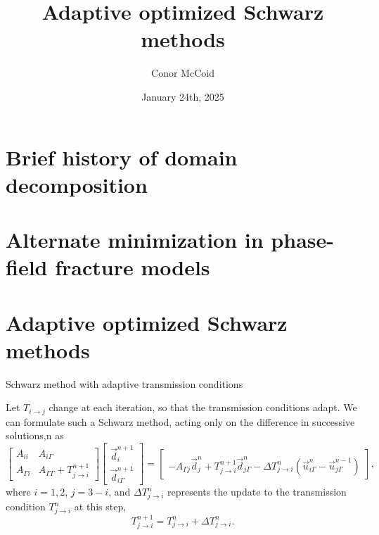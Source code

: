 \documentclass{beamer}
\title{Adaptive optimized Schwarz methods}
\author{Conor McCoid}
\institute{McMaster University}
\date{January 24th, 2025}
\begin{document}
\maketitle

\section{Brief history of domain decomposition} %





\section{Alternate minimization in phase-field fracture models} %






\section{Adaptive optimized Schwarz methods} %

\begin{frame}{Schwarz method with adaptive transmission conditions}

Let $T_{i \to j}$ change at each iteration, so that the transmission conditions adapt.
We can formulate such a Schwarz method, acting only on the difference in successive solutions,n as
\begin{equation*}
	\begin{bmatrix} A_{ii} & A_{i \Gamma} \\ A_{\Gamma i} & A_{\Gamma \Gamma} + T_{j \to i}^{n+1} \end{bmatrix}
	\begin{bmatrix} \vec{d}_i^{n+1} \\ \vec{d}_{i \Gamma}^{n+1} \end{bmatrix}
	= \begin{bmatrix} ~ \\ -A_{\Gamma j} \vec{d}_j^n + T_{j \to i}^{n+1} \vec{d}_{j \Gamma}^n - \Delta T_{j \to i}^n \left ( \vec{u}_{i \Gamma}^n - \vec{u}_{j \Gamma}^{n-1} \right ) \end{bmatrix},
\end{equation*}
where $i=1,2$, $j=3-i$, and $\Delta T_{j \to i}^n$ represents the update to the transmission condition $T_{j \to i}^n$ at this step,
\begin{equation*}
	T_{j \to i}^{n+1} = T_{j \to i}^n + \Delta T_{j \to i}^n.
\end{equation*}
\end{frame}
\end{document}
